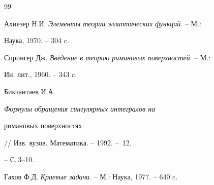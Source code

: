 \begin{thebibliography}{99}


Ахиезер Н.И. {\em Элементы теории эллиптических функций}. -- М.: 


Наука, 1970. -- 304 c. 




Спрингер Дж. {\em Введение в теорию римановых поверхностей}. -- М.: 


Ин. лит., 1960. -- 343 c. 




Бикчантаев И.А. {\em Формулы обращения сингулярных интегралов на 


римановых поверхностях} // Изв. вузов. Математика. -- 1992. -- \No\,12. 


-- С.\,3--10. 




Гахов Ф.Д. {\em Краевые задачи}. -- М.: Наука, 1977. -- 640 c. 


 


\end{thebibliography} 


 


\vskip 2cm 


 






 


\label{end} 


 


